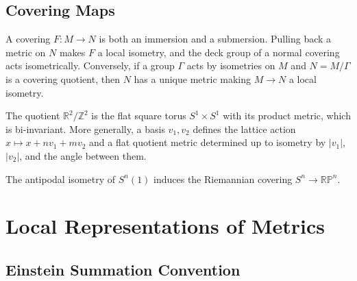 \subsection{Covering Maps}

\begin{remark}
  \label{rem:pet-ch1-covering-metric}


  A covering $F:M\to N$ is both an immersion and a submersion. Pulling back a
  metric on $N$ makes $F$ a local isometry, and the deck group of a normal
  covering acts isometrically. Conversely, if a group $\Gamma$ acts by
  isometries on $M$ and $N=M/\Gamma$ is a covering quotient, then $N$ has a
  unique metric making $M\to N$ a local isometry.
\end{remark}

\begin{example}
  \label{ex:pet-ch1-flat-torus}


  The quotient $\mathbb{R}^2/\mathbb{Z}^2$ is the flat square torus
  $S^1\times S^1$ with its product metric, which is bi-invariant. More
  generally, a basis $v_1,v_2$ defines the lattice action
  $x\mapsto x+nv_1+mv_2$ and a flat quotient metric determined up to isometry
  by $|v_1|$, $|v_2|$, and the angle between them.
\end{example}

\begin{example}
  \label{ex:pet-ch1-real-projective-space}


  The antipodal isometry of $S^n(1)$ induces the Riemannian covering
  $S^n\to\mathbb{RP}^n$.
\end{example}

\section{Local Representations of Metrics}

\subsection{Einstein Summation Convention}

